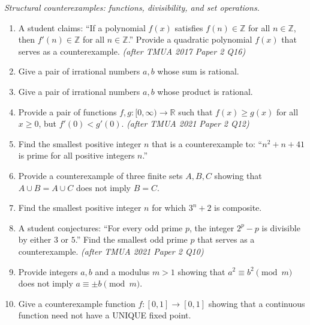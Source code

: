 \documentclass[11pt,a4paper]{article}
\begin{document}
\noindent\textit{Structural counterexamples: functions, divisibility, and set operations.}

\begin{enumerate}

\item A student claims: ``If a polynomial $f(x)$ satisfies $f(n) \in \mathbb{Z}$ for all $n \in \mathbb{Z}$, then $f'(n) \in \mathbb{Z}$ for all $n \in \mathbb{Z}$.'' Provide a quadratic polynomial $f(x)$ that serves as a counterexample. \textit{\small(after TMUA 2017 Paper 2 Q16)}

\item Give a pair of irrational numbers $a, b$ whose sum is rational.

\item Give a pair of irrational numbers $a, b$ whose product is rational.

\item Provide a pair of functions $f, g: [0, \infty) \to \mathbb{R}$ such that $f(x) \ge g(x)$ for all $x \ge 0$, but $f'(0) < g'(0)$. \textit{\small(after TMUA 2021 Paper 2 Q12)}

\item Find the smallest positive integer $n$ that is a counterexample to: ``$n^2 + n + 41$ is prime for all positive integers $n$.''

\item Provide a counterexample of three finite sets $A, B, C$ showing that $A \cup B = A \cup C$ does not imply $B = C$.

\item Find the smallest positive integer $n$ for which $3^n + 2$ is composite.

\item A student conjectures: ``For every odd prime $p$, the integer $2^p - p$ is divisible by either $3$ or $5$.'' Find the smallest odd prime $p$ that serves as a counterexample. \textit{\small(after TMUA 2021 Paper 2 Q10)}

\item Provide integers $a, b$ and a modulus $m > 1$ showing that $a^2 \equiv b^2 \pmod m$ does not imply $a \equiv \pm b \pmod m$.

\item Give a counterexample function $f: [0, 1] \to [0, 1]$ showing that a continuous function need not have a UNIQUE fixed point.

\end{enumerate}

\end{document}
